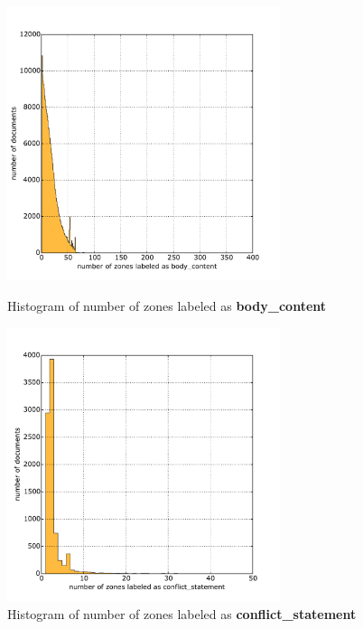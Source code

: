 \begin{figure}
\centering
\begin{minipage}[t!]{0.48\linewidth}
  \includegraphics[width=8cm]{plots/body_content_histogram}
  \caption{Histogram of number of zones labeled as \textbf{body\_content}}
  \label{fig:body_content_histogram}
\end{minipage}
\quad
\begin{minipage}[t!]{0.48\linewidth}
  \includegraphics[width=8cm]{plots/conflict_statement_histogram}
  \caption{Histogram of number of zones labeled as \textbf{conflict\_statement}}
  \label{fig:conflict_statement_histogram}
\end{minipage}
\end{figure}

